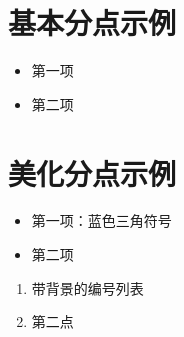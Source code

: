 \documentclass{report}
\begin{document}
\section{基本分点示例}

\begin{itemize}
    \item 第一项
    \item 第二项
\end{itemize}

\section{美化分点示例}
\begin{itemize}
    \item 第一项：蓝色三角符号
    \item 第二项
\end{itemize}

\begin{tcolorbox}[
    colback=yellow!10,
    colframe=red!50,
    title=高级分点盒子
]
\begin{enumerate}[label=(\alph*)]
    \item 带背景的编号列表
    \item 第二点
\end{enumerate}
\end{tcolorbox}
\end{document}

